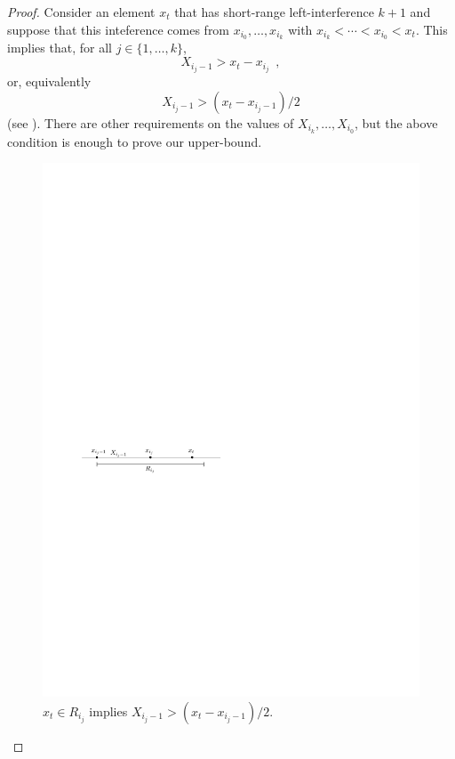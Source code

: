 \documentclass{patmorin}
\begin{document}
\begin{proof}
Consider an element $x_t$ that has short-range left-interference $k+1$
and suppose that this inteference comes from $x_{i_0},\ldots,x_{i_{k}}$
with $x_{i_{k}} <\cdots<x_{i_0}<x_t$.  This implies that, for all $j\in\{1,\ldots,k\}$,
\[
   X_{i_j-1} > x_t - x_{i_j} \enspace ,
\]
or, equivalently
\[
   X_{i_j-1} > (x_t - x_{i_j-1})/2 
\]
(see ).  There are other requirements on the values
of $X_{i_k},\ldots,X_{i_0}$, but the above condition is enough to prove
our upper-bound.

\begin{figure}
  \begin{center}\includegraphics{upper-bound}\end{center}  
  \caption{$x_t\in R_{i_j}$ implies $X_{i_j-1} > (x_t - x_{i_j-1})/2$.}
\end{figure}


\end{proof}
\end{document}
